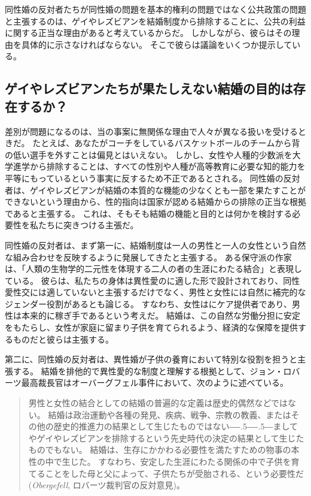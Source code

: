 \documentclass[paper=a4,book,openany]{jlreq}
\newcommand{\ig}[1]{}           %
\def\DDASH{―\kern-.5\zw―\kern-.5\zw―}
\begin{document}
同性婚の反対者たちが同性婚の問題を基本的権利の問題ではなく公共政策の問題と主張するのは、ゲイやレズビアンを結婚制度から排除することに、公共の利益に関する正当な理由があると考えているからだ。
しかしながら、彼らはその理由を具体的に示さなければならない。
そこで彼らは議論をいくつか提示している。

\subsection{ゲイやレズビアンたちが果たしえない結婚の目的は存在するか？}

差別が問題になるのは、当の事案に無関係な理由で人々が異なる扱いを受けるときだ。
たとえば、あなたがコーチをしているバスケットボールのチームから背の低い選手を外すことは偏見とはいえない。
しかし、女性や人種的少数派を大学進学から排除することは、すべての性別や人種が高等教育に必要な知的能力を平等にもっているという事実に反するため不正であるとされる。
同性婚の反対者は、ゲイやレズビアンが結婚の本質的な機能の少なくとも一部を果たすことができないという理由から、性的指向は国家が認める結婚からの排除の正当な根拠であると主張する。
これは、そもそも結婚の機能と目的とは何かを検討する必要性を私たちに突きつける主張だ。

同性婚の反対者は、まず第一に、結婚制度は一人の男性と一人の女性という自然な組み合わせを反映するように発展してきたと主張する。
ある保守派の作家は、「人類の生物学的二元性を体現する二人の者の生涯にわたる結合」と表現している\citep{jensen15:_i_oppos_same_sex_marriag}。
彼らは、私たちの身体は異性愛のに適した形で設計されており、同性愛性交には適していないと主張するだけでなく、男性と女性には自然に補完的なジェンダー役割があるとも論じる。
すなわち、女性はにケア提供者であり、男性は本来的に稼ぎ手であるという考えだ。
結婚は、この自然な労働分担に安定をもたらし、女性が家庭に留まり子供を育てられるよう、経済的な保障を提供するものだと彼らは主張する。

第二に、同性婚の反対者は、異性婚が子供の養育において特別な役割を担うと主張する。
結婚を排他的で異性愛的な制度と理解する根拠として、ジョン・ロバーツ\ig{John Roberts}最高裁長官はオーバーグフェル事件において、次のように述べている。

\begin{quote}
男性と女性の結合としての結婚の普遍的な定義は歴史的偶然などではない。
結婚は政治運動や各種の発見、疾病、戦争、宗教の教義、またはその他の歴史的推進力の結果として生じたものではない{\DDASH}ましてやゲイやレズビアンを排除するという先史時代の決定の結果として生じたものでもない。
結婚は、生存にかかわる必要性を満たすための物事の本性の中で生じた。
すなわち、安定した生涯にわたる関係の中で子供を育てることをした母と父によって、子供たちが受胎される、という必要性だ(\emph{Obergefell}, ロバーツ裁判官の反対意見)\ig{John Roberts}。

\end{quote}
\end{document}
